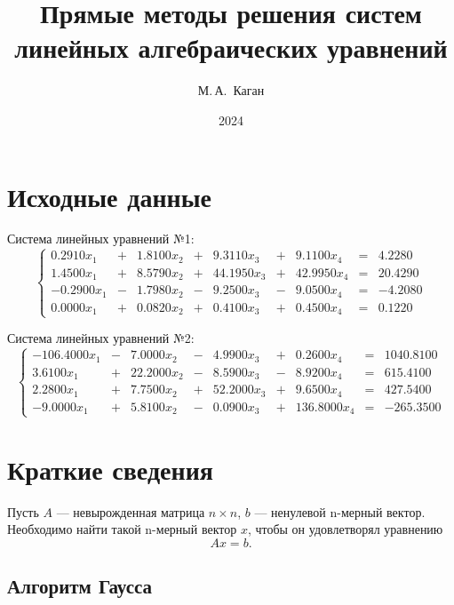 \documentclass[12pt, a4paper]{article}
\title{Прямые методы решения систем
	линейных алгебраических уравнений}
\author{М.\,А.~Каган}
\date{2024}
\begin{document}
	\maketitle
	\tableofcontents
	
	\newpage
	
	\section{Исходные данные}
	
	Система линейных уравнений №1:
	\[
	\left \{ \begin{array}{ccccccccc}
		0.2910 x_1  & +   &   1.8100 x_2 & +   &     9.3110 x_3 & +    &    9.1100 x_4 & = & 4.2280\\
		1.4500  x_1 & + &     8.5790 x_2 & +  &     44.1950 x_3  & +  &    42.9950 x_4  & = & 20.4290\\
		-0.2900 x_1  & - &     1.7980 x_2 & - &      9.2500 x_3   & - &    9.0500 x_4 & = & -4.2080  \\
		0.0000  x_1  & + &     0.0820 x_2  & +  &     0.4100 x_3 & +  &      0.4500 x_4 & = & 0.1220
	\end{array}	\right.
	\]
	 
	Система линейных уравнений №2:
	 \[
	 \left \{ \begin{array}{ccccccccc}
	 -106.4000 x_1 & - & 7.0000 x_2 & - & 4.9900 x_3 & + & 0.2600 x_4 & = & 1040.8100\\
	3.6100 x_1 & + & 22.2000 x_2 & - & 8.5900 x_3 & - & 8.9200 x_4 & = & 615.4100 \\
	 2.2800 x_1 & + & 7.7500 x_2 & + & 52.2000 x_3 & + & 9.6500 x_4 & = & 427.5400 \\
	 -9.0000 x_1 & + & 5.8100 x_2 & - & 0.0900 x_3 & + & 136.8000 x_4 & = & -265.3500
	\end{array}	\right.
	 \]  
	\section{Краткие сведения}
	Пусть $A$ --- невырожденная матрица $n \times n$, $b$ --- ненулевой n-мерный вектор. Необходимо найти такой n-мерный вектор $x$, чтобы он удовлетворял уравнению
	\begin{equation}
		\label{eq}
		A x = b.
	\end{equation}
  
	\subsection{Алгоритм Гаусса}
	
\end{document}
